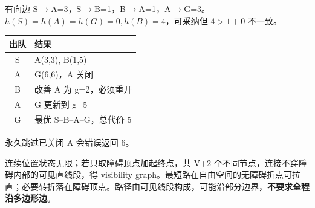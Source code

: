 有向边 S$\to$A=3，S$\to$B=1，B$\to$A=1，A$\to$G=3。$h(S)=h(A)=h(G)=0,h(B)=4$，可采纳但 $4>1+0$ 不一致。
\begin{center}\begin{tabular}{c|l}\toprule
出队&结果\\\midrule
S&A(3,3), B(1,5)\\
A&G(6,6)，A 关闭\\
B&改善 A 为 g=2，必须重开\\
A&G 更新到 g=5\\
G&最优 S--B--A--G，总代价 5\\\bottomrule\end{tabular}\end{center}
永久跳过已关闭 A 会错误返回 6。

连续位置状态无限；若只取障碍顶点加起终点，共 V+2 个不同节点，连接不穿障碍内部的可见直线段，得 visibility graph。最短路在自由空间的无障碍折点可拉直；必要转折落在障碍顶点。路径由可见线段构成，可能沿部分边界，\textbf{不要求全程沿多边形边}。
